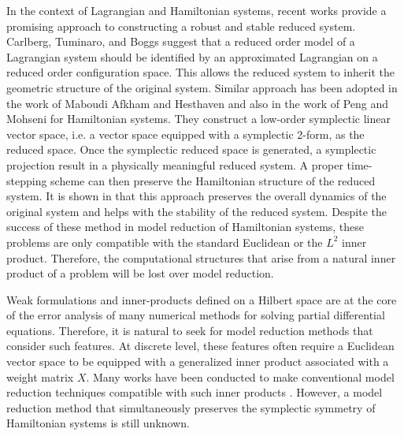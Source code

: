 In the context of Lagrangian and Hamiltonian systems, recent works provide a promising approach to constructing a robust and stable reduced system. Carlberg, Tuminaro, and Boggs \cite{Carlberg:2014ky} suggest that a reduced order model of a Lagrangian system should be identified by an approximated Lagrangian on a reduced order configuration space. This allows the reduced system to inherit the geometric structure of the original system. Similar approach has been adopted in the work of Maboudi Afkham and Hesthaven \cite{doi:10.1137/17M1111991} and also in the work of Peng and Mohseni \cite{doi:10.1137/140978922} for Hamiltonian systems. They construct a low-order symplectic linear vector space, i.e. a vector space equipped with a symplectic 2-form, as the reduced space. Once the symplectic reduced space is generated, a symplectic projection result in a physically meaningful reduced system. A proper time-stepping scheme can then preserve the Hamiltonian structure of the reduced system. It is shown in \cite{doi:10.1137/17M1111991,doi:10.1137/140978922} that this approach preserves the overall dynamics of the original system and helps with the stability of the reduced system. Despite the success of these method in model reduction of Hamiltonian systems, these problems are only compatible with the standard Euclidean or the $L^2$ inner product. Therefore, the computational structures that arise from a natural inner product of a problem will be lost over model reduction.

Weak formulations and inner-products defined on a Hilbert space are at the core of the error analysis of many numerical methods for solving partial differential equations. Therefore, it is natural to seek for model reduction methods that consider such features. At discrete level, these features often require a Euclidean vector space to be equipped with a generalized inner product associated with a weight matrix $X$. Many works have been conducted to make conventional model reduction techniques compatible with such inner products \cite{sen2006natural}. However, a model reduction method that simultaneously preserves the symplectic symmetry of Hamiltonian systems is still unknown. 

